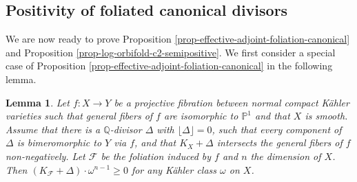 \documentclass[12pt]{amsart}
\newcommand{\<}{\leq}
\def\>{\geq}
\newcommand{\D}{\Delta}
\def\mcF{\mathcal{F}}
\newtheorem{lemma}[theorem]{Lemma}
\theoremstyle{remark}
\theoremstyle{definition}
\theoremstyle{definition}
\numberwithin{equation}{section}
\theoremstyle{definition}
\theoremstyle{definition}
\begin{document}
\subsection{Positivity of foliated canonical divisors}

We are now ready to prove Proposition \ref{prop-effective-adjoint-foliation-canonical} and  Proposition \ref{prop-log-orbifold-c2-semipositive}.    
We first consider a special case of Proposition \ref{prop-effective-adjoint-foliation-canonical} in the following lemma.
 
\begin{lemma}
\label{lem-effective-adjoint-foliation-canonical-horizontal-bimeromorphic}
Let $f\colon X \to Y$ be a projective fibration between normal  compact K\"ahler varieties such that general fibers of $f$ are isomorphic to $\mathbb{P}^1$   
and that $X$ is smooth. 
Assume that  there is a   $\mathbb{Q}$-divisor  $\D$  with  $\lfloor \D \rfloor =0$, 
such that   every component of  $\D$ is bimeromorphic  to $Y$ \textit{via} $f$, and that  $K_X+\D$ intersects the general fibers of $f$ non-negatively.
Let $\mcF$ be the foliation induced by  $f$ and $n$ the dimension of $X$. 
Then   $(K_{\mcF}+\D) \cdot \omega^{n-1} \> 0$ for any K\"ahler class $\omega$ on $X$.  
\end{lemma}
\end{document}
